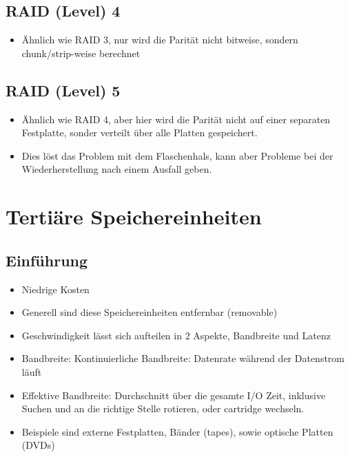 \documentclass[a4paper]{scrreprt}
\begin{document}
\subsection{RAID (Level) 4}
\begin{itemize}
	\item Ähnlich wie RAID 3, nur wird die Parität nicht bitweise, sondern chunk/strip-weise berechnet
\end{itemize}

\subsection{RAID (Level) 5}
\begin{itemize}
	\item Ähnlich wie RAID 4, aber hier wird die Parität nicht auf einer separaten Festplatte, sonder verteilt über alle Platten gespeichert.
	\item Dies löst das Problem mit dem Flaschenhals, kann aber Probleme bei der Wiederherstellung nach einem Ausfall geben.
\end{itemize}
\section{Tertiäre Speichereinheiten}
\subsection{Einführung}
\begin{itemize}
	\item Niedrige Kosten
	\item Generell sind diese Speichereinheiten entfernbar (removable)	
	\item Geschwindigkeit lässt sich aufteilen in 2 Aspekte, Bandbreite und Latenz
	\item Bandbreite: Kontinuierliche Bandbreite: Datenrate während der Datenstrom läuft
	\item Effektive Bandbreite: Durchschnitt über die gesamte I/O Zeit, inklusive Suchen und an die richtige Stelle rotieren, oder cartridge wechseln.
	\item Beispiele sind externe Festplatten, Bänder (tapes), sowie optische Platten (DVDs)

\end{itemize}
\end{document}
